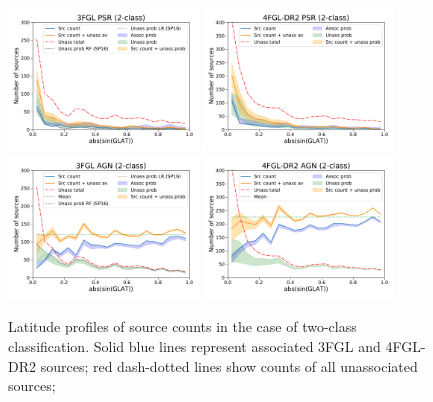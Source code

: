 \documentclass[referee]{aa} %
\begin{document}
\begin{figure}[h]
\centering
\includegraphics[width=0.45\textwidth]{plots/lat_profile_PSR_3FGL_2classes.pdf}
\includegraphics[width=0.45\textwidth]{plots/lat_profile_PSR_4FGL-DR2_2classes.pdf} \\
\includegraphics[width=0.45\textwidth]{plots/lat_profile_AGN_3FGL_2classes.pdf}
\includegraphics[width=0.45\textwidth]{plots/lat_profile_AGN_4FGL-DR2_2classes.pdf}
\caption{Latitude profiles of source counts in the case of two-class classification. 
Solid blue lines represent associated 3FGL and 4FGL-DR2  sources; red dash-dotted lines show counts of all unassociated sources; 
}
\end{figure}
\end{document}
